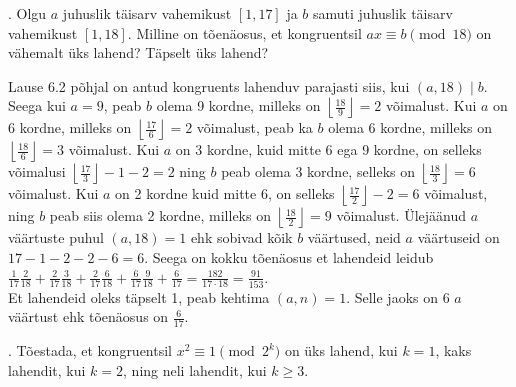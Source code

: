 \documentclass[a4paper, 10pt]{article}
\begin{document}
. Olgu $a$ juhuslik täisarv vahemikust $[1,17]$ ja $b$ samuti juhuslik täisarv vahemikust $[1,18]$. Milline on tõenäosus, et kongruentsil $ax\equiv b\pmod{18}$ on vähemalt üks lahend? Täpselt üks lahend?

\bigskip
Lause 6.2 põhjal on antud kongruents lahenduv parajasti siis, kui $(a,18)\mid b$. Seega kui $a=9$, peab $b$ olema 9 kordne, milleks on $\left\lfloor\frac{18}{9}\right\rfloor=2$ võimalust. Kui $a$ on 6 kordne, milleks on $\left\lfloor\frac{17}{6}\right\rfloor=2$ võimalust, peab ka $b$ olema 6 kordne, milleks on $\left\lfloor\frac{18}{6}\right\rfloor=3$ võimalust. Kui $a$ on 3 kordne, kuid mitte 6 ega 9 kordne, on selleks võimalusi $\left\lfloor\frac{17}{3}\right\rfloor-1-2=2$ ning $b$ peab olema 3 kordne, selleks on $\left\lfloor\frac{18}{3}\right\rfloor=6$ võimalust. Kui $a$ on 2 kordne kuid mitte 6, on selleks $\left\lfloor\frac{17}{2}\right\rfloor-2=6$ võimalust, ning $b$ peab siis olema 2 kordne, milleks on $\left\lfloor\frac{18}{2}\right\rfloor=9$ võimalust. Ülejäänud $a$ väärtuste puhul $(a,18)=1$ ehk sobivad kõik $b$ väärtused, neid $a$ väärtuseid on $17-1-2-2-6=6$. Seega on kokku tõenäosus et lahendeid leidub $\frac{1}{17}\frac{2}{18}+\frac{2}{17}\frac{3}{18}+\frac{2}{17}\frac{6}{18}+\frac{6}{17}\frac{9}{18}+\frac{6}{17}=\frac{182}{17\cdot18}=\frac{91}{153}$.\\
Et lahendeid oleks täpselt 1, peab kehtima $(a,n)=1$. Selle jaoks on 6 $a$ väärtust ehk tõenäosus on $\frac{6}{17}$.
\bigskip

\pagebreak
{}. T\~oestada, et kongruentsil $x^2\equiv 1 \pmod{2^k}$ on \"uks lahend, kui $k=1$, kaks lahendit, 
kui $k=2$, ning neli lahendit, kui $k\geq 3$.
\end{document}
